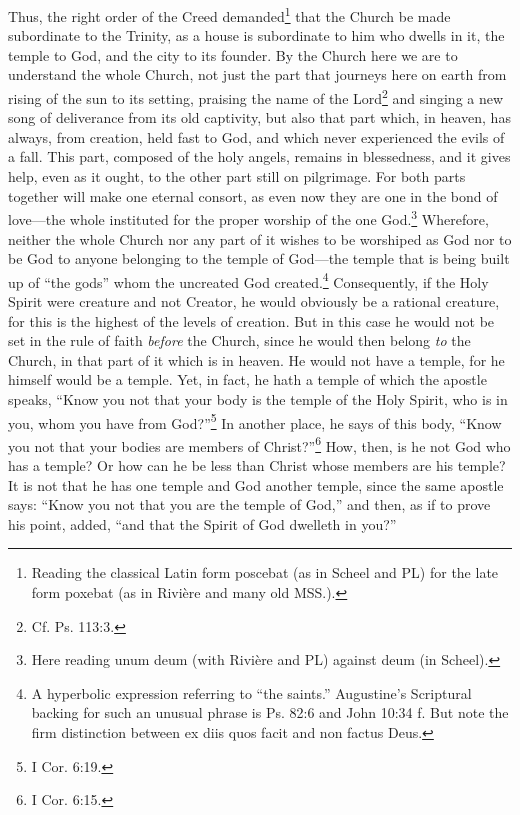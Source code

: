 Thus, the right order of the Creed demanded\footnote{Reading the classical Latin form poscebat (as in Scheel and PL) for the late form poxebat (as in Rivière and many old MSS.).} that the Church be made subordinate to the Trinity, as a house is subordinate to him who dwells in it, the temple to God, and the city to its founder. By the Church here we are to understand the whole Church, not just the part that journeys here on earth from rising of the sun to its setting, praising the name of the Lord\footnote{Cf. Ps. 113:3.} and singing a new song of deliverance from its old captivity, but also that part which, in heaven, has always, from creation, held fast to God, and which never experienced the evils of a fall. This part, composed of the holy angels, remains in blessedness, and it gives help, even as it ought, to the other part still on pilgrimage. For both parts together will make one eternal consort, as even now they are one in the bond of love—the whole instituted for the proper worship of the one God.\footnote{Here reading unum deum (with Rivière and PL) against deum (in Scheel).} Wherefore, neither the whole Church nor any part of it wishes to be worshiped as God nor to be God to anyone belonging to the temple of God—the temple that is being built up of ``the gods'' whom the uncreated God created.\footnote{A hyperbolic expression referring to ``the saints.'' Augustine's Scriptural backing for such an unusual phrase is Ps. 82:6 and John 10:34 f. But note the firm distinction between ex diis quos facit and non factus Deus.} Consequently, if the Holy Spirit were creature and not Creator, he would obviously be a rational creature, for this is the highest of the levels of creation. But in this case he would not be set in the rule of faith \emph{before} the Church, since he would then belong \emph{to} the Church, in that part of it which is in heaven. He would not have a temple, for he himself would be a temple. Yet, in fact, he hath a temple of which the apostle speaks, ``Know you not that your body is the temple of the Holy Spirit, who is in you, whom you have from God?''\footnote{I Cor. 6:19.} In another place, he says of this body, ``Know you not that your bodies are members of Christ?''\footnote{I Cor. 6:15.} How, then, is he not God who has a temple? Or how can he be less than Christ whose members are his temple? It is not that he has one temple and God another temple, since the same apostle says: ``Know you not that you are the temple of God,'' and then, as if to prove his point, added, ``and that the Spirit of God dwelleth in you?''

